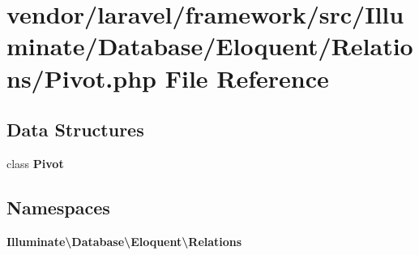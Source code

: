 \section{vendor/laravel/framework/src/\+Illuminate/\+Database/\+Eloquent/\+Relations/\+Pivot.php File Reference}
\label{_pivot_8php}
\subsection*{Data Structures}
\begin{DoxyCompactItemize}
\item 
class {\bf Pivot}
\end{DoxyCompactItemize}
\subsection*{Namespaces}
\begin{DoxyCompactItemize}
\item 
 {\bf Illuminate\textbackslash{}\+Database\textbackslash{}\+Eloquent\textbackslash{}\+Relations}
\end{DoxyCompactItemize}
